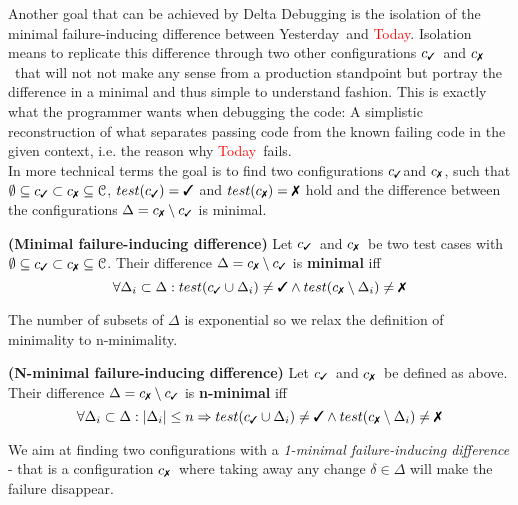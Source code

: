 \documentclass[a4paper,UKenglish]{lipics-v2018}
\newcommand{\green}[1]{\textcolor{td-green}{#1}}
\newcommand{\red}[1]{\textcolor{red}{#1}}
\newcommand{\yd}[0]{\green{Yesterday}}
\newcommand{\td}[0]{\red{Today}}
\newcommand{\C}[0]{\ensuremath{\mathcal{C}}}
\newcommand{\cmark}{\text{\ding{51}}}
\newcommand{\xmark}{\text{\ding{55}}}
\newcommand{\cpass}{\ensuremath{c_{\cmark}}}
\newcommand{\cfail}{\ensuremath{c_{\xmark}}}
\newcommand{\defsub}[1]{\textbf{(#1)} }
\begin{document}
Another goal that can be achieved by Delta Debugging is the isolation of the minimal failure-inducing difference between \yd\ and \td. Isolation means to replicate this difference through two other configurations \cpass\ and \cfail\ that will not not make any sense from a production standpoint but portray the difference in a minimal and thus simple to understand fashion. This is exactly what the programmer wants when debugging the code: A simplistic reconstruction of what separates passing code from the known failing code in the given context, i.e. the reason why \td\ fails.\\

In more technical terms the goal is to find two configurations \cpass and \cfail, such that $\emptyset \subseteq \cpass \subset \cfail \subseteq \C$, $test(\cpass) = \cmark$ and $test(\cfail) = \xmark$ hold and the difference between the configurations $\Delta = \cfail \setminus \cpass$ is minimal.

 \label{def:minimal_difference} \defsub{Minimal failure-inducing difference} Let \cpass\ and \cfail\ be two test cases with $\emptyset \subseteq \cpass \subset \cfail \subseteq \C$. Their difference $\Delta = \cfail \setminus \cpass$ is \textbf{minimal} iff \[ \forall \Delta_i \subset \Delta : test(\cpass \cup \Delta_i) \ne \cmark \wedge test(\cfail \setminus \Delta_i) \ne \xmark \]

The number of subsets of $\Delta$ is exponential so we relax the definition of minimality to n-minimality.

 \label{def:n-minimal_difference} \defsub{N-minimal failure-inducing difference} Let \cpass\ and \cfail\ be defined as above. Their difference $\Delta = \cfail \setminus \cpass$ is \textbf{n-minimal} iff \[ \forall \Delta_i \subset \Delta : |\Delta_i| \le n \Rightarrow test(\cpass \cup \Delta_i) \ne \cmark \wedge test(\cfail \setminus \Delta_i) \ne \xmark \] 

We aim at finding two configurations with a \textit{1-minimal failure-inducing difference} - that is a configuration \cfail\ where taking away any change $\delta \in \Delta$ will make the failure disappear.\\
\end{document}
